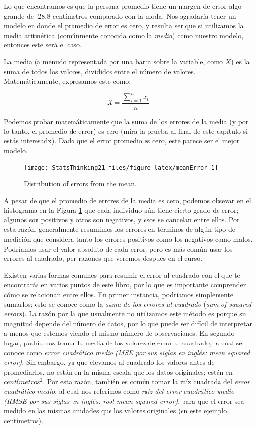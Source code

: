 \documentclass[
  12pt,
]{book}
\theoremstyle{definition}
\theoremstyle{definition}
\theoremstyle{definition}
\theoremstyle{remark}
\begin{document}
Lo que encontramos es que la persona promedio tiene un margen de error algo grande de -28.8 centímetros comparado con la moda. Nos agradaría tener un modelo en donde el promedio de error es cero, y resulta ser que si utilizamos la media aritmética (comúnmente conocida como la \emph{media}) como nuestro modelo, entonces este será el caso.

La media (a menudo representada por una barra sobre la variable, como \(\bar{X}\)) es la suma de todos los valores, divididos entre el número de valores. Matemáticamente, expresamos esto como:

\[
\bar{X} = \frac{\sum_{i=1}^{n}x_i}{n}
\]

Podemos probar matemáticamente que la suma de los errores de la media (y por lo tanto, el promedio de error) es cero (mira la prueba al final de este capítulo si estás interesadx). Dado que el error promedio es cero, este parece ser el mejor modelo.

\begin{figure}
\texttt{[image: StatsThinking21\_files/figure-latex/meanError-1]} \caption{Distribution of errors from the mean.}\label{fig:meanError}
\end{figure}

A pesar de que el promedio de errores de la media es cero, podemos obsevar en el histograma en la Figura \ref{fig:meanError} que cada individuo aún tiene cierto grado de error; algunos son positivos y otros son negativos, y esos se cancelan entre ellos. Por esta razón, generalmente resumimos los errores en términos de algún tipo de medición que considera tanto los errores positivos como los negativos como malos. Podríamos usar el valor absoluto de cada error, pero es más común usar los errores al cuadrado, por razones que veremos después en el curso.

Existen varias formas comunes para resumir el error al cuadrado con el que te encontrarás en varios puntos de este libro, por lo que es importante comprender cómo se relacionan entre ellos. En primer instancia, podríamos simplemente sumarlos; esto se conoce como la \emph{suma de los errores al cuadrado} (\emph{sum of squared errors}). La razón por la que usualmente no utilizamos este método es porque su magnitud depende del número de datos, por lo que puede ser difícil de interpretar a menos que estemos viendo el mismo número de observaciones. En segundo lugar, podríamos tomar la media de los valores de error al cuadrado, lo cual se conoce como \emph{error cuadrático medio (MSE por sus siglas en inglés: mean squared error)}. Sin embargo, ya que elevamos al cuadrado los valores antes de promediarlos, no están en la misma escala que los datos originales; están en \(centímetros^2\). Por esta razón, también es común tomar la raíz cuadrada del \emph{error cuadrático medio}, al cual nos referimos como \emph{raíz del error cuadrático medio (RMSE por sus siglas en inglés: root mean squared error)}, para que el error sea medido en las mismas unidades que los valores originales (en este ejemplo, centímetros).
\end{document}
